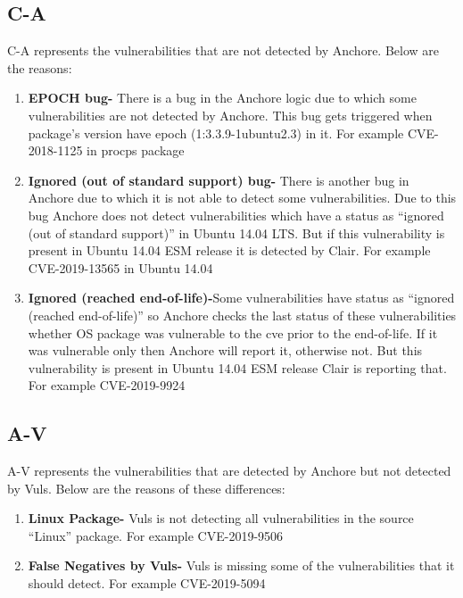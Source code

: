 \documentclass[a4paper,num-refs]{oup-contemporary}
\begin{document}
\subsection{C-A}
C-A represents the vulnerabilities that are not detected by Anchore. Below are the reasons:
\begin{enumerate}

	\item\textbf{EPOCH bug-} There is a bug in the Anchore logic due to which some vulnerabilities are 
		not detected by Anchore. This bug gets triggered when package’s version have epoch 
		(1:3.3.9-1ubuntu2.3)  in it. For example CVE-2018-1125 in procps package
	\item\textbf{Ignored (out of standard support) bug-} There is another bug in Anchore due to 
		which it is not able to detect some vulnerabilities. Due to this bug Anchore does not detect 
		vulnerabilities which have a status as “ignored (out of standard support)” in Ubuntu 14.04 LTS. 
		But if this vulnerability is present in Ubuntu 14.04 ESM release it is detected by Clair. 
		For example CVE-2019-13565 in Ubuntu 14.04
	\item\textbf{Ignored (reached end-of-life)-}Some vulnerabilities have status as “ignored (reached end-of-life)” 
		so Anchore checks the last status of these vulnerabilities whether OS package was vulnerable to the cve 
		prior to the end-of-life. If it was vulnerable only then Anchore will report it, otherwise not. But this 
		vulnerability is present in Ubuntu 14.04 ESM release Clair is reporting that. For example CVE-2019-9924
\end{enumerate}

\subsection{A-V}

A-V represents the vulnerabilities that are detected by Anchore but not detected by Vuls. Below are the reasons 
of these differences:
\begin{enumerate}

	\item\textbf{Linux Package-} Vuls is not detecting all vulnerabilities in the source “Linux” package. 
		For example CVE-2019-9506
	\item\textbf{False Negatives by Vuls-} Vuls is missing some of the vulnerabilities that it should detect. 
		For example CVE-2019-5094
\end{enumerate}
\end{document}
